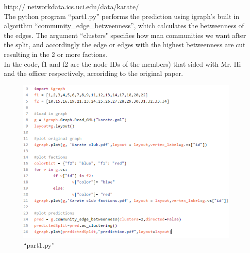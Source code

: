 \documentclass{article}
\begin{document}
 http:// networkdata.ics.uci.edu/data/karate/ \\

The python program ``part1.py'' performs the prediction using igraph's built in algorithm ``community\_edge\_betweenness'', which calculates the betweenness of the edges. The argument ``clusters" specifies how man communities we want after the split, and accordingly the edge or edges with the highest betweenness are cut resulting in the 2 or more factions.\\

In the code, f1 and f2 are the node IDs of the members)  that sided with Mr. Hi and the officer respectively, accoriding to the original paper.

\begin{figure}[H]
 \centering
 	\includegraphics[height=12 cm]{code.png}
  \caption{``part1.py"}
\end{figure}
\newpage
\end{document}
